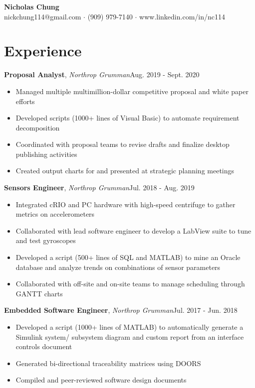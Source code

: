 \documentclass[12pt]{article}
\newcommand\firstboxx[2]{\textbf{\fontsize{12.8}{15}\selectfont #1}, \textit{#2}}
\newcommand{\itemheader}[3]{\firstboxx{#1}{#2}\hfill#3}
\begin{document}
\begin{center}
	\textbf{\LARGE Nicholas Chung} \\ \vspace{.5ex}
	nickchung114@gmail.com $\cdot$ (909) 979-7140 $\cdot$ www.linkedin.com/in/nc114
\end{center}


\section*{Experience}
\vspace*{-1em}\makebox[\linewidth]{\rule{\textwidth}{0.4pt}}

\itemheader{Proposal Analyst}{Northrop Grumman}{Aug. 2019 - Sept. 2020}
\begin{itemize}
\item Managed multiple multimillion-dollar competitive proposal and white paper efforts
\item Developed scripts (1000+ lines of Visual Basic) to automate requirement decomposition
\item Coordinated with proposal teams to revise drafts and finalize desktop publishing activities
\item Created output charts for and presented at strategic planning meetings
\end{itemize}

\bigskip
\itemheader{Sensors Engineer}{Northrop Grumman}{Jul. 2018 - Aug. 2019}
\begin{itemize}
\item Integrated cRIO and PC hardware with high-speed centrifuge to gather metrics on accelerometers
\item Collaborated with lead software engineer to develop a LabView suite to tune and test gyroscopes
\item Developed a script (500+ lines of SQL and MATLAB) to mine an Oracle database and analyze trends on combinations of sensor parameters
\item Collaborated with off-site and on-site teams to manage scheduling through GANTT charts
\end{itemize}

\bigskip
\itemheader{Embedded Software Engineer}{Northrop Grumman}{Jul. 2017 - Jun. 2018}
\begin{itemize}
\item Developed a script (1000+ lines of MATLAB) to automatically generate a Simulink system/ subsystem diagram and custom report from an interface controls document
\item Generated bi-directional traceability matrices using DOORS
\item Compiled and peer-reviewed software design documents
\end{itemize}
\end{document}
